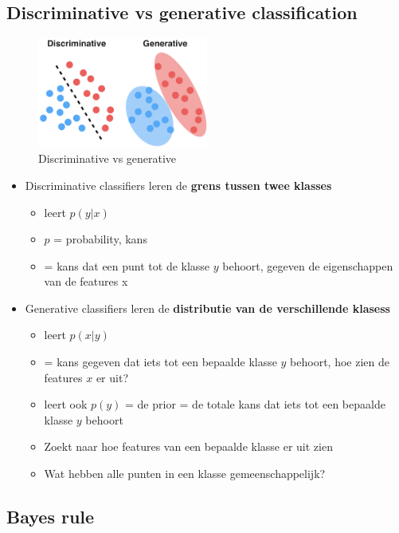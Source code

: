 \documentclass{article}
\begin{document}
\subsection{Discriminative vs generative classification}

\begin{figure}[H]
    \centering
    \includegraphics[width=0.5\textwidth]{discriminative-vs-generative.png}
    \caption{Discriminative vs generative}
\end{figure}

\begin{itemize}
    \item Discriminative classifiers leren de \textbf{grens tussen twee klasses}
    \begin{itemize}
        \item leert $p(y|x)$
        \item $p$ = probability, kans
        \item = kans dat een punt tot de klasse $y$ behoort, gegeven de eigenschappen van de features x
    \end{itemize}
    \item Generative classifiers leren de \textbf{distributie van de verschillende klasess}
    \begin{itemize}
        \item leert $p(x|y)$ 
        \item = kans gegeven dat iets tot een bepaalde klasse $y$ behoort, hoe zien de features $x$ er uit?
        \item leert ook $p(y)$ = de prior = de totale kans dat iets tot een bepaalde klasse $y$ behoort
        \item Zoekt naar hoe features van een bepaalde klasse er uit zien
        \item Wat hebben alle punten in een klasse gemeenschappelijk?
    \end{itemize}
\end{itemize}

\subsection{Bayes rule}
\end{document}
